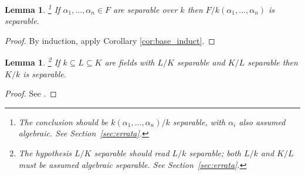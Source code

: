 \documentclass[12pt]{article}
\theoremstyle{plain}
\newtheorem{lemma}[thm]{Lemma}
\theoremstyle{definition}
\begin{document}
\begin{lemma}
\label{lem:generated}\footnote{The conclusion should be $k(\alpha_1,\ldots,\alpha_n)/k$ separable, with $\alpha_i$ also assumed algebraic. See Section~\ref{sec:errata}.}
If $\alpha_1,...,\alpha_n \in F$ are separable over $k$ then $F/k(\alpha_1,...,\alpha_n)$ is separable.
\end{lemma}
\begin{proof}
By induction, apply Corollary \ref{cor:base_induct}.
\end{proof}
%
\begin{lemma}
\label{lem:separable_ext_transitive}\footnote{The hypothesis $L/K$ separable should read $L/k$ separable; both $L/k$ and $K/L$ must be assumed algebraic separable. See Section~\ref{sec:errata}.} If $k \subseteq L \subseteq K$ are fields with $L/K$ separable and $K/L$ separable then $K/k$ is separable.
\end{lemma}
\begin{proof}
See \cite[II \S 5, 9]{Zariski}.
\end{proof}
\end{document}

